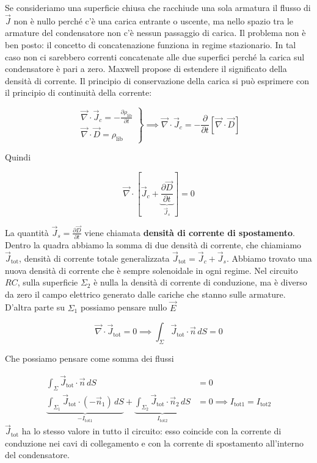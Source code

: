 Se consideriamo una superficie chiusa che racchiude una sola armatura il flusso di $\vec{J}$ non è nullo perché c'è una carica entrante o uscente, ma nello spazio tra le armature del condensatore non c'è nessun passaggio di carica. Il problema non è ben posto: il concetto di concatenazione funziona in regime stazionario. In tal caso non ci sarebbero correnti concatenate alle due superfici perché la carica sul condensatore è pari a zero. Maxwell propose di estendere il significato della densità di corrente. Il principio di conservazione della carica si può esprimere con il principio di continuità della corrente:

\[
	\left. \begin{array}{r}
	 	\vec{\nabla} \cdot \vec{J}_c = -\frac{\partial \rho_{\text{lib}}}{\partial t} \\
		\vec{\nabla} \cdot \vec{D} = \rho_{\text{lib}}
	\end{array} \right\} \implies \vec{\nabla} \cdot \vec{J}_c = - \frac{\partial}{\partial t} [\vec{\nabla} \cdot \vec{D} ]
\]

Quindi

\[
	\vec{\nabla} \cdot \left[ \vec{J}_c + \underbrace{\frac{\partial \vec{D}}{\partial t}}_{\vec{J}_s} \right] = 0
\]

La quantità $ \vec{J}_s = \frac{\partial \vec{D}}{\partial t} $ viene chiamata \textbf{densità di corrente di spostamento}. Dentro la quadra abbiamo la somma di due densità di corrente, che chiamiamo $\vec{J}_{\text{tot}}$, densità di corrente totale generalizzata $ \vec{J}_{\text{tot}} = \vec{J}_c + \vec{J}_s $. Abbiamo trovato una nuova densità di corrente che è sempre solenoidale in ogni regime. Nel circuito $RC$, sulla superficie $ \Sigma_2  $ è nulla la densità di corrente di conduzione, ma è diverso da zero il campo elettrico generato dalle cariche che stanno sulle armature. D'altra parte su $ \Sigma_1  $ possiamo pensare nullo $\vec{E}$

\[
	\vec{\nabla} \cdot \vec{J}_{\text{tot}} = 0 \implies \int_{\Sigma}\vec{J}_{\text{tot}}\cdot \vec{n} \,dS = 0
\]

Che possiamo pensare come somma dei flussi

\begin{equation*}
	\begin{aligned}
		\int_{\Sigma}\vec{J}_{\text{tot}}\cdot \vec{n} \,dS &= 0 \\
		\underbrace{\int_{\Sigma_1}\vec{J}_{\text{tot}}\cdot (-\vec{n}_1)  \,dS}_{-I_{\text{tot}1}} + \underbrace{\int_{\Sigma_2}\vec{J}_{\text{tot}}\cdot \vec{n}_2 \,dS}_{I_{\text{tot}2}} &= 0 \implies \boxed{I_{\text{tot}1}=I_{\text{tot}2}}
	\end{aligned}
\end{equation*}
$\vec{J}_{\text{tot}} $ ha lo stesso valore in tutto il circuito: esso coincide con la corrente di conduzione nei cavi di collegamento e con la corrente di spostamento all'interno del condensatore.

